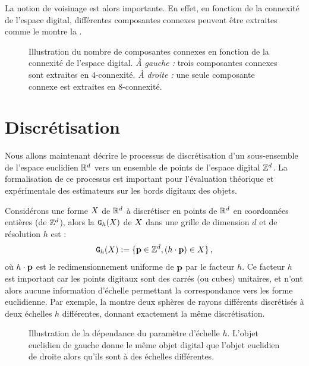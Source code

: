 La notion de voisinage est alors importante. En effet, en fonction de la
connexité de l'espace digital, différentes composantes connexes peuvent être
extraites comme le montre la .

\begin{figure}[ht]
  \begin{center}
    
  \end{center}
  \caption[Illustration du nombre de composantes connexes en fonction de la connexité de l'espace digital.]
  {Illustration du nombre de composantes connexes en fonction de la connexité de
  l'espace digital. \emph{À gauche :} trois composantes connexes sont extraites
  en $4$-connexité. \emph{À droite :} une seule composante connexe est extraites
  en $8$-connexité.\label{fig:connexite}}
\end{figure}

%
\section{Discrétisation}
\label{sec:digitization}
%
Nous allons maintenant décrire le processus de discrétisation d'un sous-ensemble
de l'espace euclidien $\mathbb{R}^d$ vers un ensemble de points de l'espace digital
$\mathbb{Z}^d$. La formalisation de ce processus est important pour l'évaluation
théorique et expérimentale des estimateurs sur les bords digitaux des objets.


Considérons une forme $X$ de $\mathbb{R}^d$ à discrétiser en points de $\mathbb{R}^d$ en
coordonnées entières (\cad de $\mathbb{Z}^d$), alors la  $\mathtt{G}_{h}(X)$ de $X$ dans une grille de dimension $d$ et de résolution $h$
est :
%
\begin{equation}
  \mathtt{G}_{h}(X) := \{ \mathbf{p} \in \mathbb{Z}^d, (h \cdot \mathbf{p}) \in X \} \,,
\end{equation}
%
où $h \cdot \mathbf{p}$ est le redimensionnement uniforme de $\mathbf{p}$ par le facteur $h$.
Ce facteur $h$ est important car les points digitaux sont des carrés (ou cubes)
unitaires, et n'ont alors aucune information d'échelle permettant la
correspondance vers les forme euclidienne. Par exemple, la
 montre deux sphères de rayons différents
discrétisés à deux échelles $h$ différentes, donnant exactement la même
discrétisation.


\begin{figure}[ht]
  \begin{center}
    
  \end{center}
  \caption[Illustration de la dépendance du paramètre d'échelle $h$.]
  {Illustration de la dépendance du paramètre d'échelle $h$. L'objet euclidien
  de gauche donne le même objet digital que l'objet euclidien de droite alors
  qu'ils sont à des échelles différentes.\label{fig:scale-digital}}
\end{figure}

